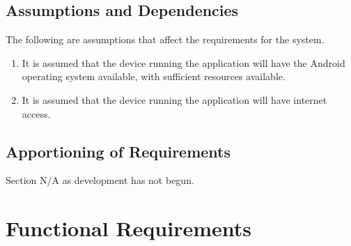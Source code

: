 \documentclass[]{article}
\begin{document}
\subsection{Assumptions and Dependencies}
\label{sub:assumptions_and_dependencies}
	The following are assumptions that affect the requirements for the system.
	\begin{enumerate}
	\item It is assumed that the device running the application will have the Android operating system available, with sufficient resources available.
	\item It is assumed that the device running the application will have internet access.
	\end{enumerate}

\subsection{Apportioning of Requirements}
\label{sub:apportioning_of_requirements}
	Section N/A as development has not begun.

\section{Functional Requirements}
\label{sec:functional_requirements}
\end{document}
